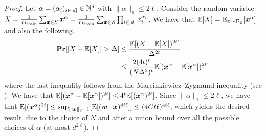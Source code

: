 \begin{proof}
    Let $\alpha=(\alpha_i)_{i\in[d]}\in{\mathbb{N}}^d$ with $\|\alpha\|_1 \le 2\ell$. Consider the random variable $X = \frac{1}{m_{\mathrm{train}}}\sum_{{\bm{x}}\in S}{\bm{x}}^\alpha = \frac{1}{m_{\mathrm{train}}}\sum_{{\bm{x}}\in S}\prod_{i\in[d]}x_i^{\alpha_i}$. We have that $\mathbb{E}[X] = \mathbb{E}_{{\bm{x}}\sim {\mathcal{D}}_{{\bm{x}}}}[{\bm{x}}^\alpha]$ and also the following.
    \begin{align*}
        \mathbf{Pr}[|X-\mathbb{E}[X]| > \Delta] &\le \frac{\mathbb{E}[(X-\mathbb{E}[X])^{2t}]}{\Delta^{2t}} \\
        &\le \frac{2(4t)^t}{(N\Delta^2)^t} \mathbb{E}[({\bm{x}}^\alpha-\mathbb{E}[{\bm{x}}^\alpha])^{2t}]
    \end{align*}
    where the last inequality follows from the Marcinkiewicz–Zygmund inequality (see \cite{FERGER201496marcinkiewicz}). We have that $\mathbb{E}[({\bm{x}}^\alpha-\mathbb{E}[{\bm{x}}^\alpha])^{2t}] \le 4^t \mathbb{E}[({\bm{x}}^{\alpha})^{2t}]$. Since $\|\alpha\|_1\le 2\ell$, we have that $\mathbb{E}[({\bm{x}}^{\alpha})^{2t}] \le \sup_{\|{\bm{w}}\|_2=1}[\mathbb{E}[({\bm{w}}\cdot {\bm{x}})^{4t \ell}]] \le (4Ct\ell)^{4t\ell}$, which yields the desired result, due to the choice of $N$ and after a union bound over all the possible choices of $\alpha$ (at most $d^{2\ell}$).
\end{proof}






